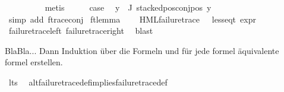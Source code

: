 \begin{isabellebody}
\ \ \ \ \ \ \ \ \isamarkupfalse%
\ metis\isanewline
\ \ \isamarkupfalse%
\ \isamarkupfalse%
\ {\isacharquery}{\kern0pt}case\ \isamarkupfalse%
\ {\isacartoucheopen}{\isasymforall}y{\isasymin}{\isasymPhi}\ {\isacharbackquote}{\kern0pt}\ J{\isachardot}{\kern0pt}\ stacked{\isacharunderscore}{\kern0pt}pos{\isacharunderscore}{\kern0pt}conj{\isacharunderscore}{\kern0pt}pos\ y{\isacartoucheclose}\isanewline
\ \ \ \ \isamarkupfalse%
\ {\isacharparenleft}{\kern0pt}simp\ add{\isacharcolon}{\kern0pt}\ f{\isacharunderscore}{\kern0pt}trace{\isacharunderscore}{\kern0pt}conj{\isacharparenright}{\kern0pt}\isanewline
{}\isamarkupfalse%
%
\endisatagproof
{\isafoldproof}%
%
\isadelimproof
\isanewline
%
\endisadelimproof
\isanewline
{}\isamarkupfalse%
\ ft{\isacharunderscore}{\kern0pt}lemma{\isacharcolon}{\kern0pt}\ \isanewline
\ \ \ {\isachardoublequoteopen}{\isacharparenleft}{\kern0pt}HML{\isacharunderscore}{\kern0pt}failure{\isacharunderscore}{\kern0pt}trace\ {\isasymphi}{\isacharparenright}{\kern0pt}\ {\isacharequal}{\kern0pt}\ {\isacharparenleft}{\kern0pt}less{\isacharunderscore}{\kern0pt}eq{\isacharunderscore}{\kern0pt}t\ {\isacharparenleft}{\kern0pt}expr\ {\isasymphi}{\isacharparenright}{\kern0pt}\ {\isacharparenleft}{\kern0pt}{\isasyminfinity}{\isacharcomma}{\kern0pt}\ {\isasyminfinity}{\isacharcomma}{\kern0pt}\ {\isasyminfinity}{\isacharcomma}{\kern0pt}\ {}{\isacharcomma}{\kern0pt}\ {}{\isacharcomma}{\kern0pt}\ {}{\isacharparenright}{\kern0pt}{\isacharparenright}{\kern0pt}{\isachardoublequoteclose}\ \isanewline
%
\isadelimproof
\ \ %
\endisadelimproof
%
\isatagproof
{}\isamarkupfalse%
\ failure{\isacharunderscore}{\kern0pt}trace{\isacharunderscore}{\kern0pt}left\ failure{\isacharunderscore}{\kern0pt}trace{\isacharunderscore}{\kern0pt}right\ \isamarkupfalse%
\ blast%
\endisatagproof
{\isafoldproof}%
%
\isadelimproof
%
\endisadelimproof
%
\begin{isamarkuptext}%
BlaBla... Dann Induktion über die Formeln und für jede formel äquivalente formel erstellen.%
\end{isamarkuptext}\isamarkuptrue%
\isamarkupfalse%
\ lts\ \isanewline
%
\isadelimvisible
%
\endisadelimvisible
%
\isatagvisible
{}\isamarkupfalse%
\ alt{\isacharunderscore}{\kern0pt}failure{\isacharunderscore}{\kern0pt}trace{\isacharunderscore}{\kern0pt}def{\isacharunderscore}{\kern0pt}implies{\isacharunderscore}{\kern0pt}failure{\isacharunderscore}{\kern0pt}trace{\isacharunderscore}{\kern0pt}def{\isacharcolon}{\kern0pt}\isanewline

\end{isabellebody}
